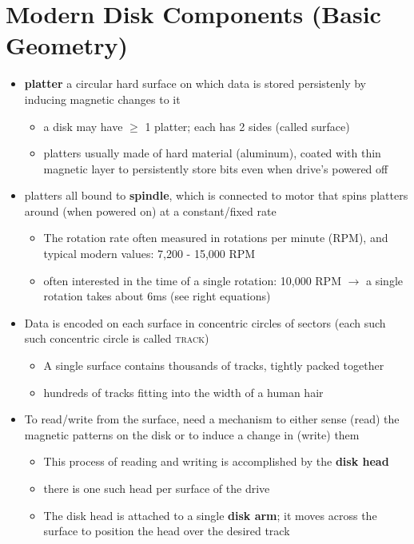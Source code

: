 \section*{Modern Disk Components (Basic Geometry)}
\begin{itemize}
\item \textbf{platter} a circular hard surface on which data is stored persistenly by inducing magnetic changes to it
  \begin{itemize}
  \item a disk may have $\geq$ 1 platter; each has 2 sides (called surface)
  \item platters usually made of hard material (aluminum), coated with thin magnetic layer to persistently store bits even when drive's powered off
  \end{itemize}
\item platters all bound to \textbf{spindle}, which is connected to motor that spins platters around (when powered on) at a constant/fixed rate
  \begin{itemize}
  \item The rotation rate often measured in rotations per minute (RPM), and typical modern values:  7,200 - 15,000 RPM
  \item often interested in the time of a single rotation: 10,000 RPM $\to$ a single rotation takes about 6ms (see right equations)
  \end{itemize}
\item Data is encoded on each surface in concentric circles of sectors (each such such concentric circle is called \textsc{track})
  \begin{itemize}
  \item A single surface contains thousands of tracks, tightly packed together
  \item hundreds of tracks fitting into the width of a human hair
  \end{itemize}
\item To read/write from the surface, need a mechanism to either sense (read) the magnetic patterns on the disk or to induce a change in (write) them
  \begin{itemize}
  \item This process of reading and writing is accomplished by the \textbf{disk head}
  \item there is one such head per surface of the drive
  \item The disk head is attached to a single \textbf{disk arm}; it moves across the surface to position the head over the desired track
  \end{itemize}
\end{itemize}
